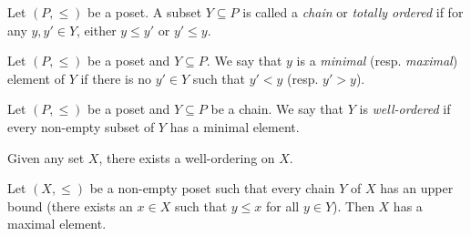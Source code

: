 \begin{definition*}
    Let $(P, \le)$ be a poset.
    A subset $Y \subseteq P$ is called a \emph{chain} or \emph{totally
    ordered} if for any $y, y' \in Y$, either $y \le y'$ or $y' \le y$.
\end{definition*}
\begin{definition}
    Let $(P, \le)$ be a poset and $Y \subseteq P$.
    We say that $y$ is a \emph{minimal} (resp. \emph{maximal}) element of
    $Y$ if there is no $y' \in Y$ such that $y' < y$ (resp. $y' > y$).
\end{definition}

\begin{definition*}
    Let $(P, \le)$ be a poset and $Y \subseteq P$ be a chain.
    We say that $Y$ is \emph{well-ordered} if every non-empty subset of $Y$
    has a minimal element.
\end{definition*}

\begin{axiom} \label{def:zfc:well-ordering}
    Given any set $X$, there exists a well-ordering on $X$.
\end{axiom}
\begin{axiom} \label{def:zfc:zorn}
    Let $(X, \le)$ be a non-empty poset such that every chain $Y$ of $X$ has
    an upper bound (there exists an $x \in X$ such that $y \le x$ for all
    $y \in Y$).
    Then $X$ has a maximal element.
\end{axiom}

